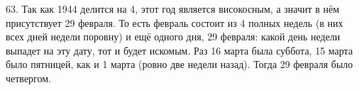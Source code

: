63. Так как 1944 делится на 4, этот год является високосным, а значит в нём присутствует 29 февраля. То есть февраль состоит из 4 полных недель (в них всех дней недели поровну) и ещё одного дня, 29 февраля: какой день недели выпадет на эту дату, тот и будет искомым. Раз 16 марта была суббота, 15 марта было пятницей, как и 1 марта (ровно две недели назад). Тогда 29 февраля было четвергом.\\
